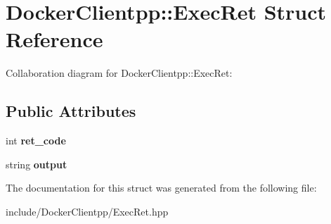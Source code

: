 \hypertarget{structDockerClientpp_1_1ExecRet}{}\section{Docker\+Clientpp\+::Exec\+Ret Struct Reference}
\label{structDockerClientpp_1_1ExecRet}


Collaboration diagram for Docker\+Clientpp\+::Exec\+Ret\+:
\subsection*{Public Attributes}
\begin{DoxyCompactItemize}
\item 
\mbox{\label{structDockerClientpp_1_1ExecRet_a61d86c3b257708b4f8a66841e76e6e44}} 
int {\bfseries ret\+\_\+code}
\item 
\mbox{\label{structDockerClientpp_1_1ExecRet_afffd08de6ce5212550a7d8f4cac3c20b}} 
string {\bfseries output}
\end{DoxyCompactItemize}


The documentation for this struct was generated from the following file\+:\begin{DoxyCompactItemize}
\item 
include/\+Docker\+Clientpp/Exec\+Ret.\+hpp\end{DoxyCompactItemize}
